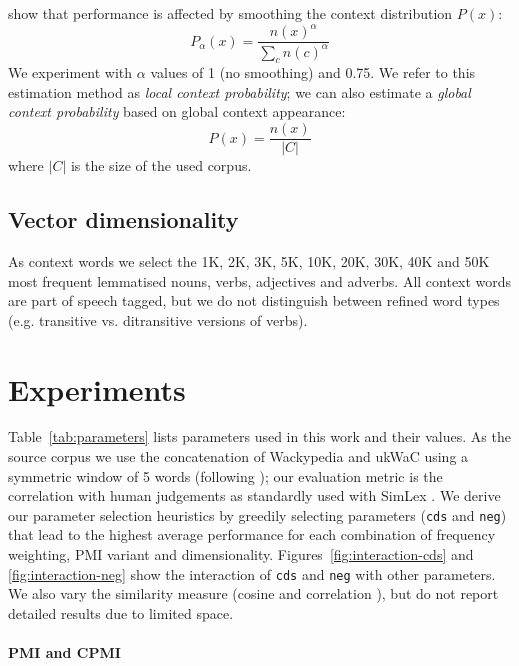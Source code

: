 \documentclass[11pt]{article}
\begin{document}
 show that performance is affected by smoothing the context distribution $P(x)$:
%
\begin{equation}
  \label{eq:cds}
  P_{\alpha}(x) = \frac{n(x)^{\alpha}}{\sum_{c}n(c)^{\alpha}}
\end{equation}
%
We experiment with $\alpha$ values of 1 (no smoothing) and 0.75. We refer to this estimation method as \emph{local context probability}; we can also estimate a \emph{global context probability} based on global context appearance:
%
\begin{equation}
  \label{eq:cds-nan}
  P(x) = \frac{n(x)}{|C|}
\end{equation}
%
where $|C|$ is the size of the used corpus.

\subsection{Vector dimensionality}
\label{sec:vect-dimens}

As context words we select the 1K, 2K, 3K, 5K, 10K, 20K, 30K, 40K and 50K most frequent lemmatised nouns, verbs, adjectives and adverbs. All context words are part of speech tagged, but we do not distinguish between refined word types (e.g. transitive vs. ditransitive versions of verbs).

\section{Experiments}
\label{sec:lexical-experiments}

Table~\ref{tab:parameters} lists parameters used in this work and their values. As the source corpus we use the concatenation of Wackypedia and ukWaC \cite{Baroni2009} using a symmetric window of 5 words (following ); our evaluation metric is the correlation with human judgements as standardly used with SimLex \cite{hill2014simlex}. We derive our parameter selection heuristics by greedily selecting parameters (\texttt{cds} and \texttt{neg}) that lead to the highest average performance for each combination of frequency weighting, PMI variant and dimensionality. Figures~\ref{fig:interaction-cds} and \ref{fig:interaction-neg} show the interaction of \texttt{cds} and \texttt{neg} with other parameters. We also vary the similarity measure (cosine and correlation  \cite{kiela-clark:2014:CVSC}), but do not report detailed results due to limited space.

\paragraph{PMI and CPMI}
\end{document}
